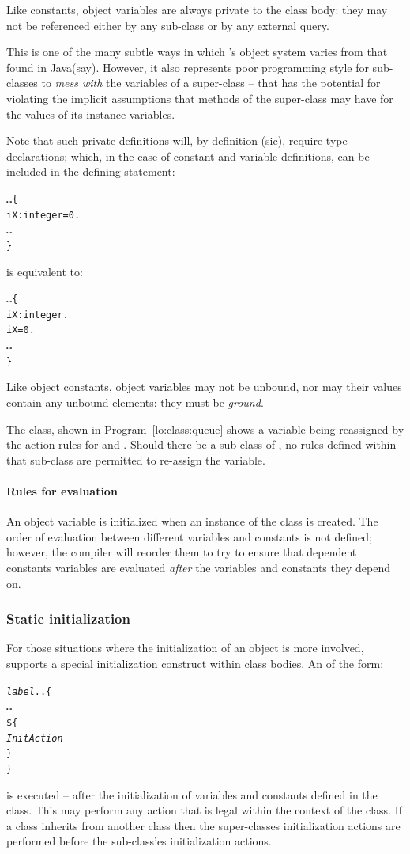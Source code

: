 Like constants, object variables are always private to the class body: they may not be referenced either by any sub-class or by any external query.
\begin{aside}
This is one of the many subtle ways in which \go's object system varies from that found in Java\tm (say).  However, it also represents poor programming style for sub-classes to \emph{mess with} the variables of a super-class -- that has the potential for violating the implicit assumptions that methods of the super-class may have for the values of its instance variables.
\end{aside}
Note that such private definitions will, by definition (sic), require type declarations; which, in the case of constant and variable definitions, can be included in the defining statement:
\begin{alltt}
\ldots\{
  iX:integer = 0.
\ldots
\}
\end{alltt}
is equivalent to:
\begin{alltt}
\ldots\{
  iX:integer.
  iX = 0.
\ldots
\}
\end{alltt}
Like object constants, object variables may not be unbound, nor may their values contain any unbound elements: they must be \emph{ground}.

The  class, shown in Program~\vref{lo:class:queue} shows a variable being reassigned by the action rules for  and . Should there be a sub-class of , no rules defined within that sub-class are permitted to re-assign the  variable.

\paragraph{Rules for evaluation}
An object variable is initialized when an instance of the class is created. The order of evaluation between different variables and constants is not defined; however, the compiler will reorder them to try to ensure that dependent constants variables are evaluated \emph{after} the variables and constants they depend on.

\subsubsection{Static initialization}
\label{object:initialization}
For those situations where the initialization of an object is more involved, \go supports a special initialization construct within class bodies. An  of the form:
\begin{alltt}
\emph{label}..\{
  \ldots
  \$\{
    \emph{InitAction}
  \}
\}
\end{alltt}
is executed -- after the initialization of variables and constants defined in the class. This  may perform any action that is legal within the context of the class. If a class inherits from another class then the super-classes initialization actions are performed before the sub-class'es initialization actions.

